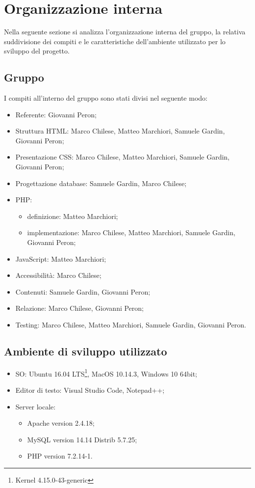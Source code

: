 \section{Organizzazione interna}
Nella seguente sezione si analizza l'organizzazione interna del gruppo, la relativa suddivisione dei compiti e le caratteristiche dell'ambiente utilizzato per lo sviluppo del progetto.
\subsection{Gruppo}
I compiti all'interno del gruppo sono stati divisi nel seguente modo:
\begin{itemize}
\item Referente: Giovanni Peron;
\item Struttura HTML: Marco Chilese, Matteo Marchiori, Samuele Gardin, Giovanni Peron;
\item Presentazione CSS: Marco Chilese, Matteo Marchiori, Samuele Gardin, Giovanni Peron;
\item Progettazione database: Samuele Gardin, Marco Chilese;
\item PHP: 
\begin{itemize}
	\item definizione: Matteo Marchiori;
	\item implementazione: Marco Chilese, Matteo Marchiori, Samuele Gardin, Giovanni Peron;
\end{itemize}
\item JavaScript: Matteo Marchiori;
\item Accessibilità: Marco Chilese;
\item Contenuti: Samuele Gardin, Giovanni Peron;
\item Relazione: Marco Chilese, Giovanni Peron;
\item Testing: Marco Chilese, Matteo Marchiori, Samuele Gardin, Giovanni Peron.
\end{itemize}
\subsection{Ambiente di sviluppo utilizzato}
\begin{itemize}
	\item SO: Ubuntu 16.04 LTS\footnote{Kernel 4.15.0-43-generic}, MacOS 10.14.3, Windows 10 64bit;
	\item Editor di testo: Visual Studio Code, Notepad++;
	\item Server locale:
		\begin{itemize}
			\item Apache version 2.4.18;
			\item MySQL version 14.14 Distrib 5.7.25;
			\item PHP version 7.2.14-1.
		\end{itemize} 
\end{itemize}

